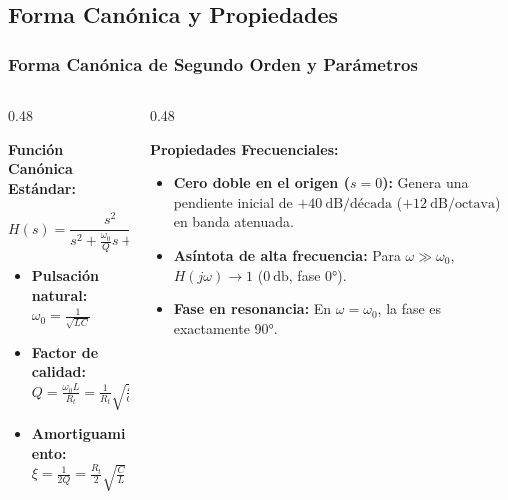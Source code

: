 \documentclass[aspectratio=169, 10pt]{beamer}
\begin{document}
\subsection{Forma Canónica y Propiedades}
\begin{frame}
  \frametitle{Forma Canónica de Segundo Orden y Parámetros}

  \begin{columns}[t, onlytextwidth]
    \begin{column}{0.48\textwidth}
      \begin{tarjeta}
        {\fontsize{9pt}{11pt}\selectfont \textbf{\color{NavyDark} Función Canónica Estándar:}}\\[2pt]
        {\fontsize{8pt}{10pt}\selectfont
        \[ H(s) = \frac{s^2}{s^2 + \frac{\omega_0}{Q} s + \omega_0^2} = \frac{s^2}{s^2 + 2\xi\omega_0 s + \omega_0^2} \]
        \begin{itemize}\setlength{\itemsep}{2pt}
          \item \textbf{Pulsación natural:} $\omega_0 = \frac{1}{\sqrt{LC}}$
          \item \textbf{Factor de calidad:} $Q = \frac{\omega_0 L}{R_t} = \frac{1}{R_t} \sqrt{\frac{L}{C}}$
          \item \textbf{Amortiguamiento:} $\xi = \frac{1}{2Q} = \frac{R_t}{2} \sqrt{\frac{C}{L}}$
        \end{itemize}
        }
      \end{tarjeta}
    \end{column}

    \begin{column}{0.48\textwidth}
      \begin{tarjeta}
        {\fontsize{9pt}{11pt}\selectfont \textbf{\color{NavyDark} Propiedades Frecuenciales:}}\\[2pt]
        {\fontsize{8pt}{10pt}\selectfont
        \begin{itemize}\setlength{\itemsep}{2.5pt}
          \item \textbf{Cero doble en el origen ($s=0$):}
          Genera una pendiente inicial de $+40\ \text{dB/década}$ ($+12\ \text{dB/octava}$) en banda atenuada.
          \item \textbf{Asíntota de alta frecuencia:}
          Para $\omega \gg \omega_0$, $H(j\omega) \to 1$ ($\qty{0}{\decibel}$, fase $\ang{0}$).
          \item \textbf{Fase en resonancia:}
          En $\omega = \omega_0$, la fase es exactamente $\ang{+90}$.
        \end{itemize}
        }
      \end{tarjeta}
    \end{column}
  \end{columns}
\end{frame}
\end{document}
